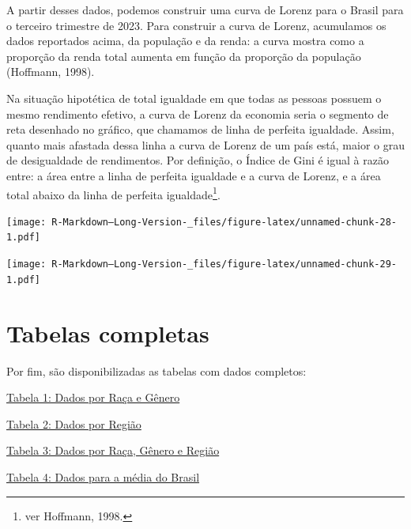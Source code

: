 \documentclass[
]{article}
\begin{document}
A partir desses dados, podemos construir uma curva de Lorenz para o
Brasil para o terceiro trimestre de 2023. Para construir a curva de
Lorenz, acumulamos os dados reportados acima, da população e da renda: a
curva mostra como a proporção da renda total aumenta em função da
proporção da população (Hoffmann, 1998).

Na situação hipotética de total igualdade em que todas as pessoas
possuem o mesmo rendimento efetivo, a curva de Lorenz da economia seria
o segmento de reta desenhado no gráfico, que chamamos de linha de
perfeita igualdade. Assim, quanto mais afastada dessa linha a curva de
Lorenz de um país está, maior o grau de desigualdade de rendimentos. Por
definição, o Índice de Gini é igual à razão entre: a área entre a linha
de perfeita igualdade e a curva de Lorenz, e a área total abaixo da
linha de perfeita igualdade\footnote{ver Hoffmann, 1998.}.

\texttt{[image: R-Markdown--Long-Version-\_files/figure-latex/unnamed-chunk-28-1.pdf]}

\texttt{[image: R-Markdown--Long-Version-\_files/figure-latex/unnamed-chunk-29-1.pdf]}

\hypertarget{tabelas-completas}{%
\section{Tabelas completas}\label{tabelas-completas}}

Por fim, são disponibilizadas as tabelas com dados completos:

\href{https://drive.google.com/file/d/1MszWt8l3aHwKP5v78_gP-sGT0e-wqccx/view?usp=sharing}{Tabela
1: Dados por Raça e Gênero}

\href{https://drive.google.com/file/d/1bCn8967ccAvB3idm5PiwU31HIFqY680K/view?usp=sharing}{Tabela
2: Dados por Região}

\href{https://drive.google.com/file/d/10pwdVV6pGg4FgjZuXLQR6h7l1Zkplgmq/view?usp=sharing}{Tabela
3: Dados por Raça, Gênero e Região}

\href{https://drive.google.com/file/d/1qThm-hEmr9hotuPpOQu8jvqbbGNkMHBs/view?usp=sharing}{Tabela
4: Dados para a média do Brasil}
\end{document}
